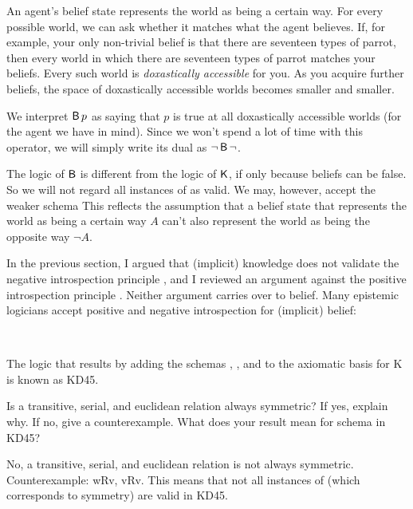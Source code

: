 An agent's belief state represents the world as being a certain way. For every
possible world, we can ask whether it matches what the agent believes. If, for
example, your only non-trivial belief is that there are seventeen types of
parrot, then every world in which there are seventeen types of parrot matches
your beliefs. Every such world is \emph{doxastically accessible} for you. As you
acquire further beliefs, the space of doxastically accessible worlds becomes
smaller and smaller.

We interpret $\operatorname{\mathsf{B}} p$ as saying that $p$ is true at all doxastically accessible
worlds (for the agent we have in mind). Since we won't spend a lot of time
with this operator, we will simply write its dual as $\neg\operatorname{\mathsf{B}}\neg$.

The logic of $\operatorname{\mathsf{B}}$ is different from the logic of $\operatorname{\mathsf{K}{}}$, if only because
beliefs can be false. So we will not regard all instances of 
%
%
as valid. We may, however, accept the weaker schema
%
%
This reflects the assumption that a belief state that represents the world as
being a certain way $A$ can't also represent the world as being the opposite way
$\neg A$.

In the previous section, I argued that (implicit) knowledge does not validate
the negative introspection principle , and I reviewed an argument against
the positive introspection principle . Neither argument carries over to
belief. Many epistemic logicians accept positive and negative introspection for
(implicit) belief:
%
\begin{principles}
  \\
\end{principles}

The logic that results by adding the schemas , , and  to the
axiomatic basis for K is known as KD45.

\begin{exercise}
  Is a transitive, serial, and euclidean relation always symmetric? If yes,
  explain why. If no, give a counterexample. What does your result mean for
  schema  in KD45?
\end{exercise}
\begin{solution}
  No, a transitive, serial, and euclidean relation is not always symmetric.
  Counterexample: wRv, vRv. This means that not all instances of  (which
  corresponds to symmetry) are valid in KD45.
\end{solution}

